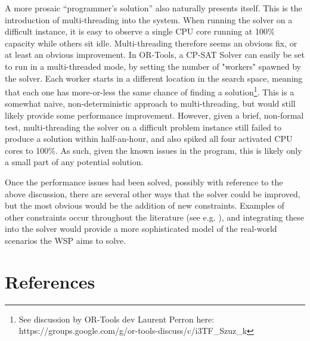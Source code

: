 \documentclass[11pt]{article}
\begin{document}
			A more prosaic ``programmer's solution'' also naturally presents itself. This is the introduction of multi-threading into the system.
			When running the solver on a difficult instance, it is easy to observe a single CPU core running at 100\% capacity while others sit idle.
			Multi-threading therefore seems an obvious fix, or at least an obvious improvement.
			In OR-Tools, a CP-SAT Solver can easily be set to run in a multi-threaded mode,
			by setting the number of "workers" spawned by the solver. Each worker starts in a different location in the search space,
			meaning that each one has more-or-less the same chance of finding a solution\footnote{See discussion by OR-Tools dev Laurent Perron here: https://groups.google.com/g/or-tools-discuss/c/i3TF\_Szuz\_k}.
			This is a somewhat naive, non-deterministic approach to multi-threading, but would still likely provide some performance improvement.
			However, given a brief, non-formal test, multi-threading the solver on a difficult problem instance still failed to produce a solution within half-an-hour,
			and also spiked all four activated CPU cores to 100\%. As such, given the known issues in the program, this is likely only a small part of any potential solution.

			Once the performance issues had been solved, possibly with reference to the above discussion,
			there are several other ways that the solver could be improved, but the most obvious would be the addition of new constraints.
			Examples of other constraints occur throughout the literature (see e.g.\cite{cohen14} \cite{karapetyan19}),
			and integrating these into the solver would provide a more sophisticated model of the real-world scenarios the WSP aims to solve.

	\section{References}
	
	
\end{document}
